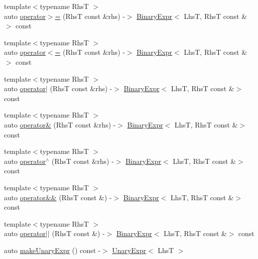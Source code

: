 \begin{DoxyCompactItemize}
\item 
{\footnotesize template$<$typename RhsT $>$ }\\auto \mbox{\hyperlink{class_catch_1_1_expr_lhs_aff594ae5b957105c517a6257d2e730f0}{operator$>$=}} (RhsT const \&rhs) -\/$>$ \mbox{\hyperlink{class_catch_1_1_binary_expr}{Binary\+Expr}}$<$ LhsT, RhsT const \&$>$ const
\item 
{\footnotesize template$<$typename RhsT $>$ }\\auto \mbox{\hyperlink{class_catch_1_1_expr_lhs_a6bd8a22c1a7fe2f66d71d7196f20af4f}{operator$<$=}} (RhsT const \&rhs) -\/$>$ \mbox{\hyperlink{class_catch_1_1_binary_expr}{Binary\+Expr}}$<$ LhsT, RhsT const \&$>$ const
\item 
{\footnotesize template$<$typename RhsT $>$ }\\auto \mbox{\hyperlink{class_catch_1_1_expr_lhs_a764131057e79fd458ee1a8062f8c8732}{operator$\vert$}} (RhsT const \&rhs) -\/$>$ \mbox{\hyperlink{class_catch_1_1_binary_expr}{Binary\+Expr}}$<$ LhsT, RhsT const \&$>$ const
\item 
{\footnotesize template$<$typename RhsT $>$ }\\auto \mbox{\hyperlink{class_catch_1_1_expr_lhs_a6ed35a83c811df0c1187ff727ef83e65}{operator\&}} (RhsT const \&rhs) -\/$>$ \mbox{\hyperlink{class_catch_1_1_binary_expr}{Binary\+Expr}}$<$ LhsT, RhsT const \&$>$ const
\item 
{\footnotesize template$<$typename RhsT $>$ }\\auto \mbox{\hyperlink{class_catch_1_1_expr_lhs_aecefc9a1b4bf4f8fa8882fda04d60fb4}{operator$^\wedge$}} (RhsT const \&rhs) -\/$>$ \mbox{\hyperlink{class_catch_1_1_binary_expr}{Binary\+Expr}}$<$ LhsT, RhsT const \&$>$ const
\item 
{\footnotesize template$<$typename RhsT $>$ }\\auto \mbox{\hyperlink{class_catch_1_1_expr_lhs_a5d85cdd34a136c37fa5e5283c2ff54d5}{operator\&\&}} (RhsT const \&) -\/$>$ \mbox{\hyperlink{class_catch_1_1_binary_expr}{Binary\+Expr}}$<$ LhsT, RhsT const \&$>$ const
\item 
{\footnotesize template$<$typename RhsT $>$ }\\auto \mbox{\hyperlink{class_catch_1_1_expr_lhs_a33e5f813f5c236b9b77d977c04266f4d}{operator$\vert$$\vert$}} (RhsT const \&) -\/$>$ \mbox{\hyperlink{class_catch_1_1_binary_expr}{Binary\+Expr}}$<$ LhsT, RhsT const \&$>$ const
\item 
auto \mbox{\hyperlink{class_catch_1_1_expr_lhs_ab68bd6d5d3ae21b7fba9010150fba95d}{make\+Unary\+Expr}} () const -\/$>$ \mbox{\hyperlink{class_catch_1_1_unary_expr}{Unary\+Expr}}$<$ LhsT $>$
\end{DoxyCompactItemize}


